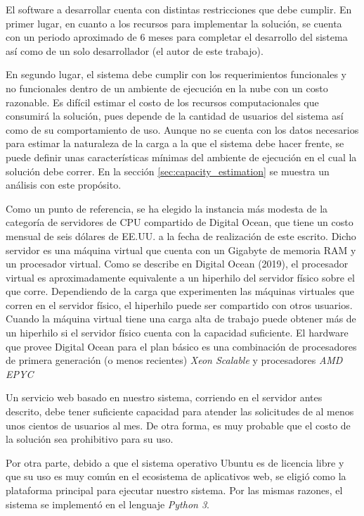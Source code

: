 El software a desarrollar cuenta con distintas restricciones que debe cumplir.
En primer lugar, en cuanto a los recursos para implementar la solución, se
cuenta con un periodo aproximado de 6 meses para completar el desarrollo del
sistema así como de un solo desarrollador (el autor de este trabajo).

En segundo lugar, el sistema debe cumplir con los requerimientos funcionales y
no funcionales dentro de un ambiente de ejecución en la nube con un costo
razonable. Es difícil estimar el costo de los recursos computacionales que
consumirá la solución, pues depende de la cantidad de usuarios del sistema así
como de su comportamiento de uso. Aunque no se cuenta con los datos necesarios
para estimar la naturaleza de la carga a la que el sistema debe hacer frente, se
puede definir unas características mínimas del ambiente de ejecución en el cual
la solución debe correr. En la sección \ref{sec:capacity_estimation} se muestra
un análisis con este propósito.

Como un punto de referencia, se ha elegido la instancia más modesta de la
categoría de servidores de CPU compartido de Digital Ocean, que tiene un costo
mensual de seis dólares de EE.UU. a la fecha de realización de este escrito.
Dicho servidor es una máquina virtual que cuenta con un Gigabyte de memoria RAM
y un procesador virtual. Como se describe en Digital Ocean (2019), el procesador
virtual es aproximadamente equivalente a un hiperhilo del servidor físico sobre
el que corre. Dependiendo de la carga que experimenten las máquinas virtuales
que corren en el servidor físico, el hiperhilo puede ser compartido con otros
usuarios. Cuando la máquina virtual tiene una carga alta de trabajo puede
obtener más de un hiperhilo si el servidor físico cuenta con la capacidad
suficiente. El hardware que provee Digital Ocean para el plan básico es una
combinación de procesadores de primera generación (o menos recientes)
\textit{Xeon Scalable} y procesadores \textit{AMD EPYC}

Un servicio web basado en nuestro sistema, corriendo en el servidor antes
descrito, debe tener suficiente capacidad para atender las solicitudes de al
menos unos cientos de usuarios al mes. De otra forma, es muy probable que el
costo de la solución sea prohibitivo para su uso.

Por otra parte, debido a que el sistema operativo Ubuntu es de licencia libre y
que su uso es muy común en el ecosistema de aplicativos web, se eligió como la
plataforma principal para ejecutar nuestro sistema. Por las mismas razones, el
sistema se implementó en el lenguaje \textit{Python 3}.

